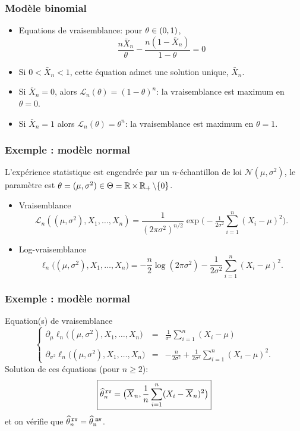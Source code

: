 \begin{frame}
\frametitle{Modèle binomial}
\begin{itemize}
\item \alert{Equations de vraisemblance}: pour $\theta \in \left(0,1\right)$,
$$
\frac{n \bar{X}_n}{\theta} - \frac{n(1-\bar{X}_n)}{1-\theta}= 0
$$
\item Si $0 < \bar{X}_n < 1$, cette équation admet une solution unique, $\bar{X}_n$.
\item Si $\bar{X}_n=0$, alors $\mathcal{L}_n(\theta)= (1-\theta)^n$: la vraisemblance est maximum en $\theta=0$.
\item Si $\bar{X}_n=1$ alors $\mathcal{L}_n(\theta)= \theta^n$: la vraisemblance est maximum en $\theta=1$. 
\end{itemize}
\end{frame}

\begin{frame}
\frametitle{Exemple : modèle normal } L'expérience statistique est
engendrée par un $n$-échantillon de loi ${\mathcal
N}(\mu,\sigma^2)$, le paramètre est $\theta = (\mu,\sigma^2)\in
\Theta = \operatorname{{\mathbb R}}\times \operatorname{{\mathbb R}}_+\setminus\{0\}$.
\begin{itemize}
\item
\alert{Vraisemblance} $${\mathcal L}_n((\mu,\sigma^2),
X_1,\ldots, X_n) =
\frac1{(2\pi\sigma^2)^{n/2}}\exp\big(-\tfrac{1}{2\sigma^2}
\sum_{i=1}^n(X_i-\mu)^2\big).$$
\item \alert{Log-vraisemblance}
$$\ell_n\big((\mu,\sigma^2),X_1,\ldots, X_n\big) = -\frac{n}{2}
\log(2\pi \sigma^2)-\frac{1}{2\sigma^2}\sum_{i = 1}^n (X_i-\mu)^2.$$
\end{itemize}
\end{frame}

\begin{frame}
\frametitle{Exemple : modèle normal }
\alert{Equation(s) de vraisemblance}
$$
\left\{
\begin{array}{lll}
\partial_\mu\ell_n \big((\mu,\sigma^2),X_1,\ldots, X_n\big) & = &\displaystyle\frac{1}{\sigma^2}\sum_{i = 1}^n (X_i-\mu) \\ \\
\partial_{\sigma^2}\ell_n \big((\mu,\sigma^2),X_1,\ldots, X_n\big)&
 = &\displaystyle -\frac{n}{2\sigma^2}+\frac{1}{2\sigma^4}
 \sum_{i = 1}^n (X_i-\mu)^2.
\end{array}
\right.
$$
Solution de ces \'equations (pour $n \geq 2$):
$$\boxed{\widehat
\theta_n^{\,{\tt rv}} = \big(\overline{X}_n,\frac{1}{n} \sum_{i =
1}^n(X_i-\overline{X}_n)^2\big)}$$ et on vérifie que $\widehat
\theta_n^{\,{\tt rv}} =\operatorname{\widehat \theta_n^{\,\,{\tt mv}}}$.
\end{frame}



